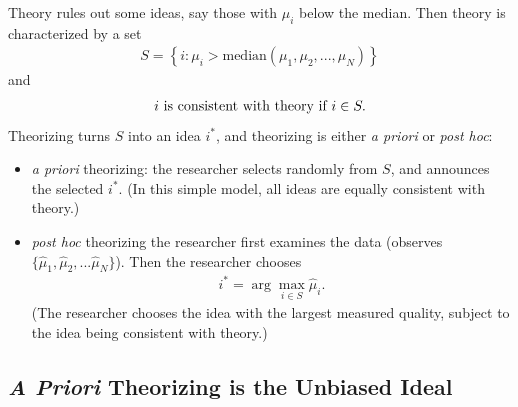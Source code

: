 \documentclass[12pt,english]{article}
\theoremstyle{plain}
\theoremstyle{plain}
\begin{document}
Theory rules out some ideas, say those with $\mu_{i}$ below the median. Then theory is characterized by a set 
\begin{align}
    S = \left\{ i: \mu_{i} > \text{median}\left(\mu_1,\mu_2,...,\mu_N\right)\right\}
    \label{eq:ez:S}
\end{align}
and 
\begin{align}
\text{\ensuremath{i} is consistent with theory if }i\in S .
\end{align}
Theorizing turns $S$ into an idea $i^\ast$, and theorizing is either \emph{a priori} or \emph{post hoc}: 
\begin{itemize}
\item \emph{a priori} theorizing: the researcher selects randomly from $S$, and announces the selected $i^\ast$. (In this simple model, all ideas are equally consistent with theory.)
\item \emph{post hoc} theorizing the researcher first examines the data (observes $\{\hat{\mu}_1,\hat{\mu}_2,...\hat{\mu}_N\}$). Then the researcher chooses 
\begin{align}
    i^\ast =  \arg\max_{i\in S }\hat{\mu}_{i}.\label{eq:given-ihat}
\end{align}
(The researcher chooses the idea with the largest measured quality, subject to the idea being consistent with theory.)
\end{itemize}

\subsection{\emph{A Priori} Theorizing is the Unbiased Ideal}
\end{document}
